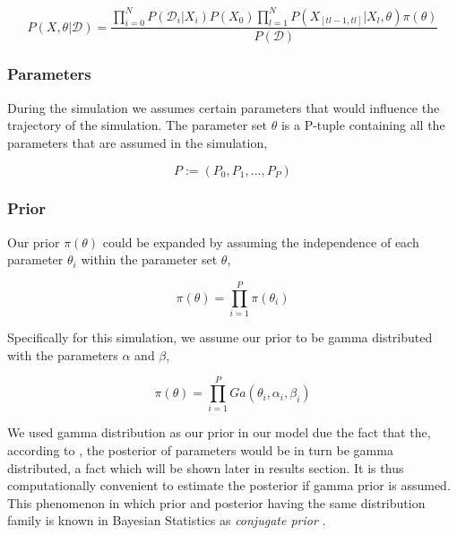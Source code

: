 \documentclass{bioinfo}
\begin{document}


\begin{equation}
P(X, \theta | \mathcal{D}) = \frac{\prod_{i=0}^{N} P(\mathcal{D}_i | X_i) P(X_0) \prod_{l=1}^{N} P(X_{[tl-1, tl]} | X_l, \theta)\pi(\theta)}{P(\mathcal{D})}\label{eq:07}
\end{equation}

\subsubsection{Parameters}

During the simulation we assumes certain parameters that would influence the trajectory of the simulation. The parameter set $\theta$ is a P-tuple containing all the parameters that are assumed in the simulation,

\begin{equation}
P := (P_0, P_1, \dots , P_P)\label{eq:08}
\end{equation}

\subsubsection{Prior}

Our prior $\pi(\theta)$ could be expanded by assuming the independence of each parameter $\theta_i$ within the parameter set $\theta$,

\begin{equation}
\pi(\theta) = \prod_{i=1}^{P} \pi(\theta_i)\label{eq:09}
\end{equation}

Specifically for this simulation, we assume our prior to be gamma distributed with the parameters $\alpha$ and $\beta$,

\begin{equation}
\pi(\theta) = \prod_{i=1}^{P} Ga(\theta_i, \alpha_i, \beta_i)\label{eq:10}
\end{equation}

We used gamma distribution as our prior in our model due the fact that the, according to \citep{Feigelman16}, the posterior of parameters would be in turn be gamma distributed, a fact which will be shown later in results section. It is thus computationally convenient to estimate the posterior if gamma prior is assumed. This phenomenon in which prior and posterior having the same distribution family is known in Bayesian Statistics as \textit{conjugate prior} \citep{Gelman09}.
\end{document}
